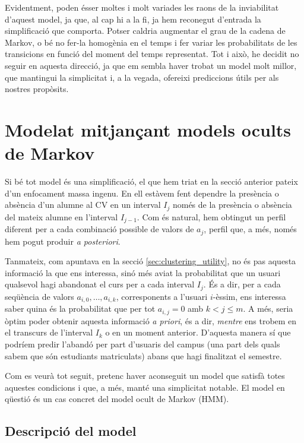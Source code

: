 \documentclass[
	a4paper,
	twoside,
	justified
]{tufte-book}
\begin{document}
Evidentment, poden ésser moltes i molt variades les raons de la inviabilitat d'aquest model, ja que, al cap hi a la fi, ja hem reconegut d'entrada la simplificació que comporta. Potser caldria augmentar el grau de la cadena de Markov, o bé no fer-la homogènia en el temps i fer variar les probabilitats de les transicions en funció del moment del temps representat. Tot i això, he decidit no seguir en aquesta direcció, ja que em sembla haver trobat un model molt millor, que mantingui la simplicitat i, a la vegada, ofereixi prediccions útils per als nostres propòsits.  

\section{Modelat mitjançant models ocults de Markov}

Si bé tot model és una simplificació, el que hem triat en la secció anterior  pateix d'un enfocament massa ingenu. En ell estàvem fent dependre la presència o absència d'un alumne al CV en un interval $I_j$ només de la presència o absència del mateix alumne en l'interval $I_{j-1}$. Com és natural, hem obtingut un perfil diferent per a cada combinació possible de valors de $a_j$, perfil que, a més, només hem pogut produir \emph{a posteriori}. 

Tanmateix, com apuntava en la secció \ref{sec:clustering_utility}, no és pas aquesta informació la que ens interessa, sinó més aviat la probabilitat que un usuari qualsevol hagi abandonat el curs per a cada interval $I_j$. És a dir, per a cada seqüència de valors $a_{i,0}, \ldots, a_{i,k}$, corresponents a l'usuari $i$-èssim, ens interessa saber quina és la probabilitat que per tot $a_{i,j} = 0$ amb $k < j \leq m$. A més, seria òptim poder obtenir aquesta informació \emph{a priori}, és a dir, \emph{mentre} ens trobem en el transcurs de l'interval $I_k$ o en un moment anterior. D'aquesta manera sí que podríem predir l'abandó per part d'usuaris del campus (una part dels quals sabem que són estudiants matriculats) abans que hagi finalitzat el semestre.

Com es veurà tot seguit, pretenc haver aconseguit un model que satisfà totes aquestes condicions i que, a més, manté una simplicitat notable. El model en qüestió és un cas concret del model ocult de Markov (HMM). 

\subsection{Descripció del model}
\end{document}
